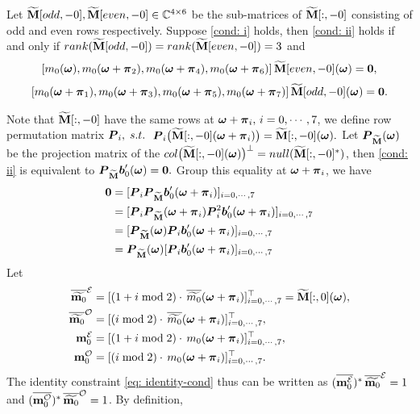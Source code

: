\begin{proposition}\label{prop: m0_formula}
Let $\M[odd,-0],\M[even,-0]\in\mathbb{C}^{4\times6}$ be the sub-matrices of $\M[:,-0]$ consisting of odd and even rows respectively. Suppose \ref{cond: i} holds, then \ref{cond: ii} holds if and only if $rank(\M[odd,-0]) = rank(\M[even,-0]) = 3$ and 
\begin{align}\label{eq: m0-even-null}
[m_0(\V{\omega}),m_0(\V{\omega}+\V{\pi}_2), m_0(\V{\omega} +\V{\pi}_4), m_0(\V{\omega}+\V{\pi}_6)]\, \M[even,-0](\V{\omega}) = \V{0},
\end{align}
\begin{align}\label{eq: m0-odd-null}
[m_0(\V{\omega}+\V{\pi}_1),m_0(\V{\omega}+\V{\pi}_3), m_0(\V{\omega} +\V{\pi}_5), m_0(\V{\omega}+\V{\pi}_7)] \,\M[odd,-0](\V{\omega}) = \V{0}.
\end{align}
\end{proposition}
Note that $\M[:,-0]$ have the same rows at $\V{\omega} + \V{\pi}_i,\,i = 0,\cdots,7$, we define row permutation matrix $\V{P}_i,\; s.t.\,$ $\V{P}_i\big(\M[:,-0](\V{\omega} + \V{\pi}_i)\big) = \M[:,-0](\V{\omega}). $ Let $\V{P}_{\M}(\V{\omega})$ be the projection matrix of the $col\big(\M[:,-0](\V{\omega})\big)^\bot = null(\M[:,-0]^*)$, then \ref{cond: ii} is equivalent to $\V{P}_{\M}\V{b}_0'(\V{\omega}) = \V{0}.$ Group this equality at $\V{\omega}+\V{\pi}_i$, we have 
\begin{align}\label{eq: group-proj}
\V{0} & = [\V{P}_i\V{P}_{\M}\V{b}_0'(\V{\omega} + \V{\pi}_i) ]_{i=0,\cdots,7}\notag\\
&= [\V{P}_i\V{P}_{\M}(\V{\omega}+\V{\pi}_i)\V{P}_i^2\V{b}_0'(\V{\omega}+\V{\pi}_i) ]_{i = 0,\cdots,7}\notag\\
&= [\V{P}_{\M}(\V{\omega})\V{P}_i\V{b}_0'(\V{\omega}+\V{\pi}_i)]_{i = 0,\cdots,7}\notag\\
&= \V{P}_{\M}(\V{\omega})[\V{P}_i\V{b}_0'(\V{\omega}+\V{\pi}_i)]_{i = 0,\cdots,7}
\end{align}
Let 
\begin{align*}
\mteven&= [ (1 + i \bmod 2)\cdot\,\sbarmp{0}{i}]_{i=0,\cdots,7}^\top = \M[:,0](\V{\omega}),\\
\mtodd&= [ (i \bmod 2)\cdot\,\sbarmp{0}{i}]_{i=0,\cdots,7}^\top,\\
\meven&= [ (1 + i \bmod 2)\cdot\,m_0(\V{\omega} + \V{\pi}_i)]_{i=0,\cdots,7}^\top,\\
\modd&= [ ( i \bmod 2)\cdot\,m_0(\V{\omega} + \V{\pi}_i)]_{i=0,\cdots,7}^\top.
\end{align*}
The identity constraint \eqref{eq: identity-cond} thus can be written as $(\overline{\meven})^*\,\mteven = 1$ and $(\overline{\modd})^*\,\mtodd = 1$. By definition, 

